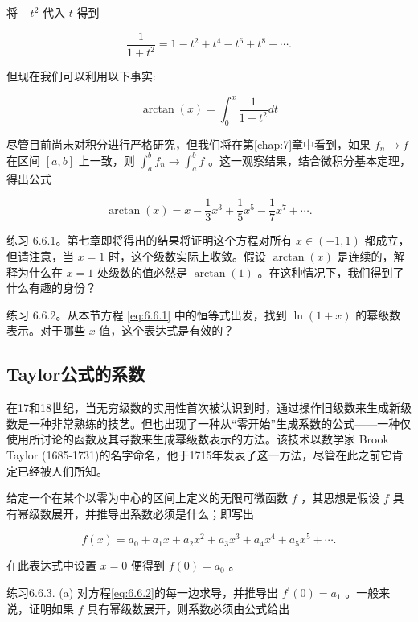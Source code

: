 将 \(- {t}^{2}\) 代入 \(t\) 得到

\[
\frac{1}{1 + {t}^{2}} = 1 - {t}^{2} + {t}^{4} - {t}^{6} + {t}^{8} - \cdots .
\]

但现在我们可以利用以下事实:

\[
\arctan \left( x\right)  = {\int }_{0}^{x}\frac{1}{1 + {t}^{2}}{dt}
\]

尽管目前尚未对积分进行严格研究，但我们将在第\ref{chap:7}章中看到，如果 \({f}_{n} \rightarrow  f\) 在区间 \(\left\lbrack  {a,b}\right\rbrack\) 上一致，则 \({\int }_{a}^{b}{f}_{n} \rightarrow  {\int }_{a}^{b}f\) 。这一观察结果，结合微积分基本定理，得出公式

\[
\arctan \left( x\right)  = x - \frac{1}{3}{x}^{3} + \frac{1}{5}{x}^{5} - \frac{1}{7}{x}^{7} + \cdots .
\]

练习 6.6.1。第七章即将得出的结果将证明这个方程对所有 \(x \in  \left( {-1,1}\right)\) 都成立，但请注意，当 \(x = 1\) 时，这个级数实际上收敛。假设 \(\arctan \left( x\right)\) 是连续的，解释为什么在 \(x = 1\) 处级数的值必然是 \(\arctan \left( 1\right)\) 。在这种情况下，我们得到了什么有趣的身份？

练习 6.6.2。从本节方程 \eqref{eq:6.6.1} 中的恒等式出发，找到 \(\ln \left( {1 + x}\right)\) 的幂级数表示。对于哪些 \(x\) 值，这个表达式是有效的？

\subsection{Taylor公式的系数}

在17和18世纪，当无穷级数的实用性首次被认识到时，通过操作旧级数来生成新级数是一种非常熟练的技艺。但也出现了一种从“零开始”生成系数的公式——一种仅使用所讨论的函数及其导数来生成幂级数表示的方法。该技术以数学家 Brook Taylor (1685-1731)的名字命名，他于1715年发表了这一方法，尽管在此之前它肯定已经被人们所知。

给定一个在某个以零为中心的区间上定义的无限可微函数 \(f\) ，其思想是假设 \(f\) 具有幂级数展开，并推导出系数必须是什么；即写出

\begin{equation}
\label{eq:6.6.2}
f\left( x\right)  = {a}_{0} + {a}_{1}x + {a}_{2}{x}^{2} + {a}_{3}{x}^{3} + {a}_{4}{x}^{4} + {a}_{5}{x}^{5} + \cdots .
\end{equation}

在此表达式中设置 \(x = 0\) 便得到 \(f\left( 0\right)  = {a}_{0}\) 。

练习6.6.3. (a) 对方程\eqref{eq:6.6.2}的每一边求导，并推导出 \({f}^{\prime }\left( 0\right)  = {a}_{1}\) 。一般来说，证明如果 \(f\) 具有幂级数展开，则系数必须由公式给出

